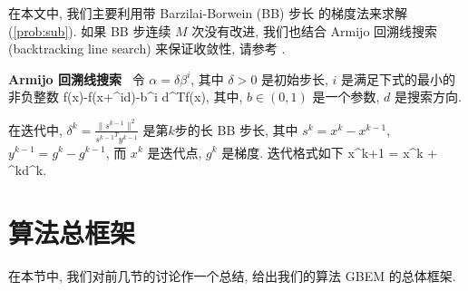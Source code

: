 在本文中, 我们主要利用带 Barzilai-Borwein (BB) 步长 \cite{BB1988} 
的梯度法来求解 (\ref{prob:sub}). 
如果 BB 步连续 $M$ 次没有改进, 
我们也结合 Armijo 回溯线搜索 (backtracking line search) 来保证收敛性,
请参考 \cite{Armijo1966,Sun2006}.

\textbf{Armijo 回溯线搜索} ~令 $\alpha = \delta\beta^i$, 
其中 $\delta>0$ 是初始步长, 
$i$ 是满足下式的最小的非负整数
\be f(x)-f(x+\delta\beta^id)\geq -b\delta\beta^i d^T\nabla f(x), \ee
其中, $b\in (0,1)$ 是一个参数, $d$ 是搜索方向.

在迭代中, 
$\delta^k=\frac{\|s^{k-1}\|^2}{{s^{k-1}}^Ty^{k-1}}$ 是第$k$步的长 BB 步长, 
其中 $s^k=x^k-x^{k-1}$, $y^{k-1}=g^k-g^{k-1}$, 而 $x^k$ 是迭代点,
$g^k$ 是梯度. 
迭代格式如下
\be x^{k+1} = x^k + \alpha^kd^k.\ee


\section{算法总框架}
\label{sec:framework}
在本节中, 我们对前几节的讨论作一个总结,
给出我们的算法 GBEM
的总体框架.
%
%

